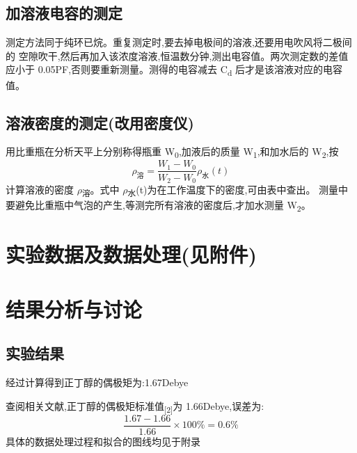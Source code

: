 \documentclass[11pt]{report}
\begin{document}
\section{加溶液电容的测定}
\label{sec:orga0f67ce}
测定方法同于纯环已烷。重复测定时,要去掉电极间的溶液,还要用电吹风将二极间的
空隙吹干,然后再加入该浓度溶液,恒温数分钟,测出电容值。两次测定数的差值应小于
0.05PF,否则要重新测量。测得的电容减去 C\textsubscript{d} 后才是该溶液对应的电容值。
\section{溶液密度的测定(改用密度仪)}
\label{sec:orgfeb3b5d}
用比重瓶在分析天平上分别称得瓶重 W\textsubscript{0},加液后的质量 W\textsubscript{1},和加水后的 W\textsubscript{2},按
\[
\rho_{溶}=\frac{W_{1}-W_{0}}{W_{2}-W_{0}}\rho_{水}(t)
\]
计算溶液的密度 \(\rho\)\textsubscript{溶}。式中 \(\rho\)\textsubscript{水}(t)为在工作温度下的密度,可由表中查出。
测量中要避免比重瓶中气泡的产生,等测完所有溶液的密度后,才加水测量 W\textsubscript{2}。
\chapter{实验数据及数据处理(见附件)}
\label{sec:org9164f56}
\chapter{结果分析与讨论}
\label{sec:org433e8b0}
\section{实验结果}
\label{sec:org5f4ce1e}
经过计算得到正丁醇的偶极矩为:1.67Debye

查阅相关文献,正丁醇的偶极矩标准值\textsubscript{[2]}为 1.66Debye,误差为:
\[
\frac{1.67-1.66}{1.66}\times 100\%=0.6\%
\]
具体的数据处理过程和拟合的图线均见于附录
\end{document}
